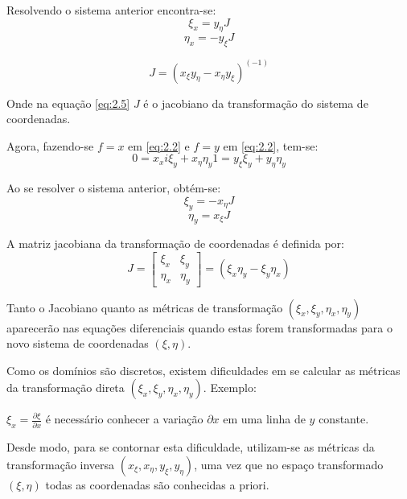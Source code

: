 Resolvendo o sistema anterior encontra-se:
\begin{equation}
    \label{eq:2.3}
    \xi_x = y_\eta J
\end{equation}
\begin{equation}
    \label{eq:2.4}
    \eta_x = -y_\xi J
\end{equation}

\begin{equation}
    J = (x_\xi y_\eta - x_\eta y_\xi)^(-1)
    \label{eq:2.5}
\end{equation}

Onde na equação \ref{eq:2.5} $J$  é o jacobiano da transformação do sistema de coordenadas.

Agora, fazendo-se $f=x$ em \ref{eq:2.2} e $f=y$ em \ref{eq:2.2}, tem-se:
\begin{equation*}
    0 = x_xi \xi_y + x_\eta \eta_y
    1 = y_\xi \xi_y + y_\eta \eta_y
\end{equation*}

Ao se resolver o sistema anterior, obtém-se:
\begin{equation}
    \label{eq:2.6}
    \xi_y = -x_\eta J
\end{equation}
\begin{equation}
    \label{eq:2.7}
    \eta_y = x_\xi J
\end{equation}

A matriz jacobiana da transformação de coordenadas é definida por:
\begin{equation}
    \label{eq:2.8}
    J =
    \begin{bmatrix}
        \xi_x & \xi_y\\
        \eta_x & \eta_y
    \end{bmatrix}
    = (\xi_x \eta_y - \xi_y \eta_x)
\end{equation}

Tanto o Jacobiano quanto as métricas de transformação $(\xi_x, \xi_y, \eta_x, \eta_y)$ aparecerão nas equações diferenciais quando estas forem transformadas para o novo sistema de coordenadas $(\xi,\eta)$.

Como os domínios são discretos, existem dificuldades em se calcular as métricas da transformação direta $(\xi_x, \xi_y, \eta_x, \eta_y)$. Exemplo:

$\xi_x=\frac{\partial \xi}{\partial x}$ é necessário conhecer a variação $\partial x$ em uma linha de $y$ constante.

Desde modo, para se contornar esta dificuldade, utilizam-se as métricas da transformação inversa $(x_\xi, x_\eta, y_\xi, y_\eta)$, uma vez que no espaço transformado $(\xi, \eta)$ todas as coordenadas são conhecidas a priori.


